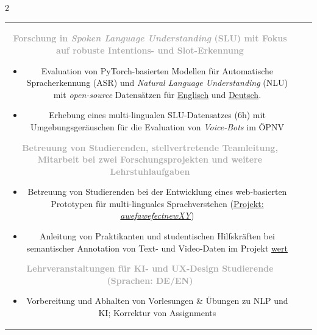 \documentclass[pastel]{hipstercv}
\begin{document}
\begin{paracol}{2}
\begin{tabular}{c| p{} c}
{ \vspace{-0.25em}
 \textcolor{darkgray}{\textbf{\small Forschung in \textit{Spoken Language Understanding} (SLU) mit Fokus auf robuste Intentions- und Slot-Erkennung}}
    \begin{itemize} 	    
        \item Evaluation von PyTorch-basierten Modellen für Automatische Spracherkennung (ASR) und \textit{Natural Language Understanding} (NLU) mit \textit{open-source} Datensätzen für \href{https://www.openslr.org/12}{Englisch} und \href{https://github.com/uhh-lt/kaldi-tuda-de}{Deutsch}.
        \item Erhebung eines multi-lingualen SLU-Datensatzes (6h) mit Umgebungsgeräuschen  für die Evaluation von \textit{Voice-Bots} im ÖPNV %
    \end{itemize}  
\vspace{1em}
\textcolor{darkgray}{\textbf{\small Betreuung von Studierenden, stellvertretende Teamleitung, Mitarbeit bei zwei Forschungsprojekten und weitere Lehrstuhlaufgaben}}
 \begin{itemize}
    \item Betreuung von Studierenden bei der Entwicklung eines web-basierten Prototypen für multi-linguales Sprachverstehen (\href{https://www.werwer.de/asdfprojectnewXY-eine-neue-stufe-des-oepnv-angebots-der-region-Beispielstadt/}{Projekt: \textit{awefawefectnewXY}})
    \item Anleitung von Praktikanten und studentischen Hilfskräften bei semantischer Annotation von Text- und Video-Daten im Projekt \href{https://www.myscience.de/news/wire/kuenstliche_faiowfjwaifojaweio23}{wert} 
 \end{itemize}
 \vspace{1em}
 \textcolor{darkgray}{\textbf{\small Lehrveranstaltungen für KI- und UX-Design Studierende (Sprachen: DE/EN)}}
 \begin{itemize}
    \item Vorbereitung und Abhalten von Vorlesungen \& Übungen zu NLP und KI; Korrektur von Assignments

\end{itemize}}
\end{tabular}
\end{paracol}
\end{document}
